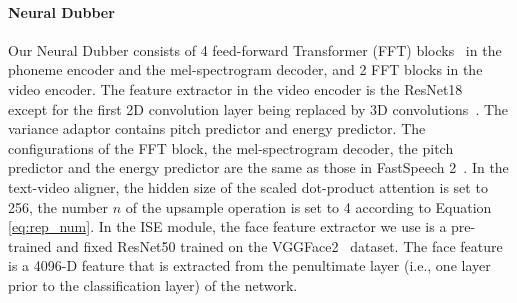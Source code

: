 \documentclass{article}
\begin{document}
\paragraph{Neural Dubber}
Our Neural Dubber consists of 4 feed-forward Transformer (FFT) blocks~\cite{ren2019fastspeech} in the phoneme encoder and the mel-spectrogram decoder, and 2 FFT blocks in the video encoder. The feature extractor in the video encoder is the ResNet18~\cite{he2016deep} except for the first 2D convolution layer being replaced by 3D convolutions~\cite{petridis2018end}.  The variance adaptor contains pitch predictor and energy predictor. The configurations of the FFT block, the mel-spectrogram decoder, the pitch predictor and the energy predictor are the same as those in FastSpeech 2~\cite{ren2021fastspeech}. 
In the text-video aligner, the hidden size of the scaled dot-product attention is set to 256, the number $n$ of the upsample operation is set to 4 according to Equation \eqref{eq:rep_num}.
In the ISE module, the face feature extractor we use is a pre-trained and fixed ResNet50 trained on the VGGFace2~\cite{cao2018vggface2} dataset. 
The face feature is a 4096-D feature that is extracted from the penultimate layer (i.e., one layer prior to the classification layer) of the network.
\end{document}
